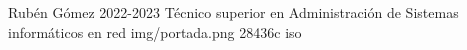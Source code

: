\documentclass{\ClassPath/yukibook}
\begin{document}
    {Rubén Gómez}  %
    {2022-2023}    %
    {Técnico superior en Administración de \linebreak Sistemas informáticos en red} %
    {}%
    {}%
    {img/portada.png} %
    {28436c}
    {iso} %

    \coverpage

    \tableofcontents

    \graphicspath{{img/iso/}}
    
\end{document}

